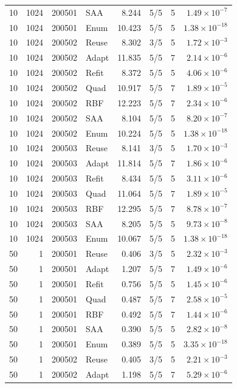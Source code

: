 \begin{longtable}{rrrlrrrr}
10 & 1024 & 200501 & SAA & 8.244 & 5/5 & 5 & $1.49\times10^{-7}$\\
10 & 1024 & 200501 & Enum & 10.423 & 5/5 & 5 & $1.38\times10^{-18}$\\
10 & 1024 & 200502 & Reuse & 8.302 & 3/5 & 5 & $1.72\times10^{-3}$\\
10 & 1024 & 200502 & Adapt & 11.835 & 5/5 & 7 & $2.14\times10^{-6}$\\
10 & 1024 & 200502 & Refit & 8.372 & 5/5 & 5 & $4.06\times10^{-6}$\\
10 & 1024 & 200502 & Quad & 10.917 & 5/5 & 7 & $1.89\times10^{-5}$\\
10 & 1024 & 200502 & RBF & 12.223 & 5/5 & 7 & $2.34\times10^{-6}$\\
10 & 1024 & 200502 & SAA & 8.104 & 5/5 & 5 & $8.20\times10^{-7}$\\
10 & 1024 & 200502 & Enum & 10.224 & 5/5 & 5 & $1.38\times10^{-18}$\\
10 & 1024 & 200503 & Reuse & 8.141 & 3/5 & 5 & $1.70\times10^{-3}$\\
10 & 1024 & 200503 & Adapt & 11.814 & 5/5 & 7 & $1.86\times10^{-6}$\\
10 & 1024 & 200503 & Refit & 8.434 & 5/5 & 5 & $3.11\times10^{-6}$\\
10 & 1024 & 200503 & Quad & 11.064 & 5/5 & 7 & $1.89\times10^{-5}$\\
10 & 1024 & 200503 & RBF & 12.295 & 5/5 & 7 & $8.78\times10^{-7}$\\
10 & 1024 & 200503 & SAA & 8.205 & 5/5 & 5 & $9.73\times10^{-8}$\\
10 & 1024 & 200503 & Enum & 10.067 & 5/5 & 5 & $1.38\times10^{-18}$\\
50 & 1 & 200501 & Reuse & 0.406 & 3/5 & 5 & $2.32\times10^{-3}$\\
50 & 1 & 200501 & Adapt & 1.207 & 5/5 & 7 & $1.49\times10^{-6}$\\
50 & 1 & 200501 & Refit & 0.756 & 5/5 & 5 & $1.45\times10^{-6}$\\
50 & 1 & 200501 & Quad & 0.487 & 5/5 & 7 & $2.58\times10^{-5}$\\
50 & 1 & 200501 & RBF & 0.492 & 5/5 & 7 & $1.44\times10^{-6}$\\
50 & 1 & 200501 & SAA & 0.390 & 5/5 & 5 & $2.82\times10^{-8}$\\
50 & 1 & 200501 & Enum & 0.389 & 5/5 & 5 & $3.35\times10^{-18}$\\
50 & 1 & 200502 & Reuse & 0.405 & 3/5 & 5 & $2.21\times10^{-3}$\\
50 & 1 & 200502 & Adapt & 1.198 & 5/5 & 7 & $5.29\times10^{-6}$\\

\end{longtable}

